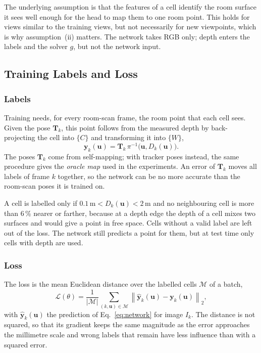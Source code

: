 \documentclass[9pt,shortpaper,twoside,web]{ieeecolor2}
\begin{document}
The underlying assumption is that the features of a cell identify the room surface it sees well enough for the head to map them to one room point. This holds for views similar to the training views, but not necessarily for new viewpoints, which is why assumption~(ii) matters. The network takes RGB only; depth enters the labels and the solver $g$, but not the network input.

\subsection{Training Labels and Loss}
\label{sec:training}
\subsubsection{Labels} Training needs, for every room-scan frame, the room point that each cell sees. Given the pose $\mathbf{T}_k$, this point follows from the measured depth by back-projecting the cell into $\{C\}$ and transforming it into $\{W\}$,
\begin{equation}
  \mathbf{y}_k(\mathbf{u})=\mathbf{T}_k\,\pi^{-1}\big(\mathbf{u},D_k(\mathbf{u})\big).
  \label{eq:label}
\end{equation}
The poses $\mathbf{T}_k$ come from self-mapping; with tracker poses instead, the same procedure gives the \emph{oracle map} used in the experiments. An error of $\mathbf{T}_k$ moves all labels of frame $k$ together, so the network can be no more accurate than the room-scan poses it is trained on.

A cell is labelled only if $0.1\,\mathrm{m}<D_k(\mathbf{u})<2$\,m and no neighbouring cell is more than 6\,\% nearer or farther, because at a depth edge the depth of a cell mixes two surfaces and would give a point in free space. Cells without a valid label are left out of the loss. The network still predicts a point for them, but at test time only cells with depth are used.

\subsubsection{Loss} The loss is the mean Euclidean distance over the labelled cells $\mathcal{M}$ of a batch,
\begin{equation}
  \mathcal{L}(\theta)=\frac{1}{|\mathcal{M}|}\sum_{(k,\mathbf{u})\in\mathcal{M}}\left\|\hat{\mathbf{y}}_k(\mathbf{u})-\mathbf{y}_k(\mathbf{u})\right\|_2 ,
  \label{eq:loss}
\end{equation}
with $\hat{\mathbf{y}}_k(\mathbf{u})$ the prediction of Eq.~\eqref{eq:network} for image $I_k$. The distance is not squared, so that its gradient keeps the same magnitude as the error approaches the millimetre scale and wrong labels that remain have less influence than with a squared error.
\end{document}
